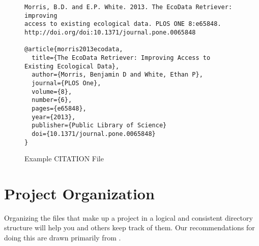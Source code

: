 \documentclass[10pt]{article}
\begin{document}
\begin{figure}
\begin{verbatim}
Morris, B.D. and E.P. White. 2013. The EcoData Retriever: improving
access to existing ecological data. PLOS ONE 8:e65848.
http://doi.org/doi:10.1371/journal.pone.0065848

@article{morris2013ecodata,
  title={The EcoData Retriever: Improving Access to Existing Ecological Data},
  author={Morris, Benjamin D and White, Ethan P},
  journal={PLOS One},
  volume={8},
  number={6},
  pages={e65848},
  year={2013},
  publisher={Public Library of Science}
  doi={10.1371/journal.pone.0065848}
}
\end{verbatim}
\caption{Example CITATION File}
\label{fig:citation}
\end{figure}

\section{Project Organization}\label{sec:project}

Organizing the files that make up a project in a logical and
consistent directory structure will help you and others keep track of
them.  Our recommendations for doing this are drawn primarily from
\cite{noble2009,gentzkow2014}.
\end{document}
